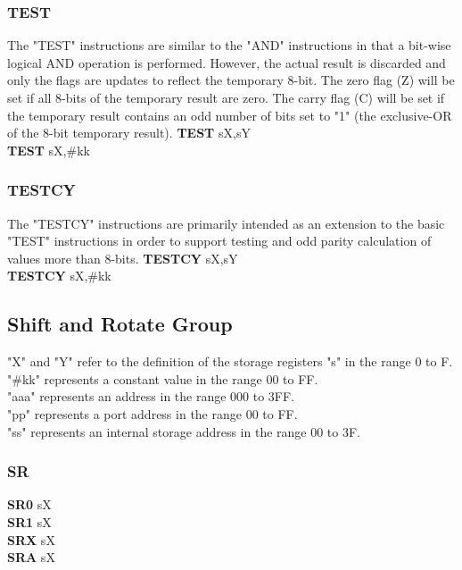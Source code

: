 {                        \subsubsection{TEST}
                        The "TEST" instructions are similar to the "AND" instructions in that a bit-wise logical AND operation is performed. However, the actual result is discarded and
                        only the flags are updates to reflect the temporary 8-bit. The zero flag (Z) will be set if all 8-bits of the temporary result are zero.
                        The carry flag (C) will be set if the temporary result contains an odd number of bits set to "1" (the exclusive-OR of the 8-bit temporary result).
                            \textbf{TEST} sX,sY\\
                            \textbf{TEST} sX,\#kk\\
                        \subsubsection{TESTCY}
                        The "TESTCY" instructions are primarily intended as an extension to the basic "TEST" instructions in order to support testing and odd parity calculation of
                        values more than 8-bits.
                            \textbf{TESTCY} sX,sY\\
                            \textbf{TESTCY} sX,\#kk\\
                \subsection{Shift and Rotate Group}
                "X" and "Y" refer to the definition of the storage registers "s" in the range 0 to F.\\
                "\#kk" represents a constant value in the range 00 to FF.\\
                "aaa" represents an address in the range 000 to 3FF.\\
                "pp" represents a port address in the range 00 to FF.\\
                "ss" represents an internal storage address in the range 00 to 3F.\\
                        \subsubsection{SR}
                            \textbf{SR0} sX\\
                            \textbf{SR1} sX\\
                            \textbf{SRX} sX\\
                            \textbf{SRA} sX\\
}
